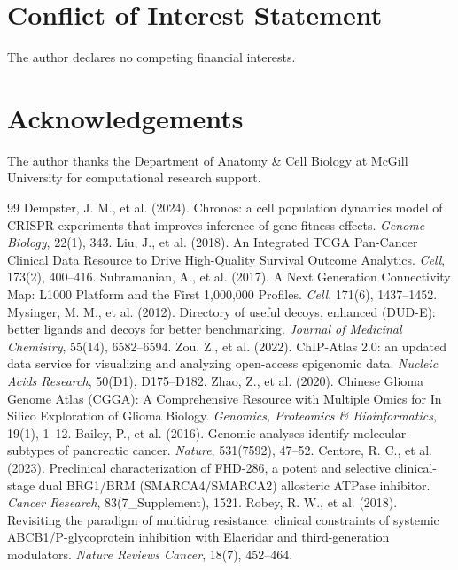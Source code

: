 \documentclass[11pt,a4paper]{article}
\begin{document}
\section*{Conflict of Interest Statement}
The author declares no competing financial interests.

\section*{Acknowledgements}
The author thanks the Department of Anatomy \& Cell Biology at McGill University for computational research support.

\begin{thebibliography}{99}
 Dempster, J. M., et al. (2024). Chronos: a cell population dynamics model of CRISPR experiments that improves inference of gene fitness effects. \textit{Genome Biology}, 22(1), 343.
 Liu, J., et al. (2018). An Integrated TCGA Pan-Cancer Clinical Data Resource to Drive High-Quality Survival Outcome Analytics. \textit{Cell}, 173(2), 400--416.
 Subramanian, A., et al. (2017). A Next Generation Connectivity Map: L1000 Platform and the First 1,000,000 Profiles. \textit{Cell}, 171(6), 1437--1452.
 Mysinger, M. M., et al. (2012). Directory of useful decoys, enhanced (DUD-E): better ligands and decoys for better benchmarking. \textit{Journal of Medicinal Chemistry}, 55(14), 6582--6594.
 Zou, Z., et al. (2022). ChIP-Atlas 2.0: an updated data service for visualizing and analyzing open-access epigenomic data. \textit{Nucleic Acids Research}, 50(D1), D175--D182.
 Zhao, Z., et al. (2020). Chinese Glioma Genome Atlas (CGGA): A Comprehensive Resource with Multiple Omics for In Silico Exploration of Glioma Biology. \textit{Genomics, Proteomics \& Bioinformatics}, 19(1), 1--12.
 Bailey, P., et al. (2016). Genomic analyses identify molecular subtypes of pancreatic cancer. \textit{Nature}, 531(7592), 47--52.
 Centore, R. C., et al. (2023). Preclinical characterization of FHD-286, a potent and selective clinical-stage dual BRG1/BRM (SMARCA4/SMARCA2) allosteric ATPase inhibitor. \textit{Cancer Research}, 83(7\_Supplement), 1521.
 Robey, R. W., et al. (2018). Revisiting the paradigm of multidrug resistance: clinical constraints of systemic ABCB1/P-glycoprotein inhibition with Elacridar and third-generation modulators. \textit{Nature Reviews Cancer}, 18(7), 452--464.
\end{thebibliography}
\end{document}
